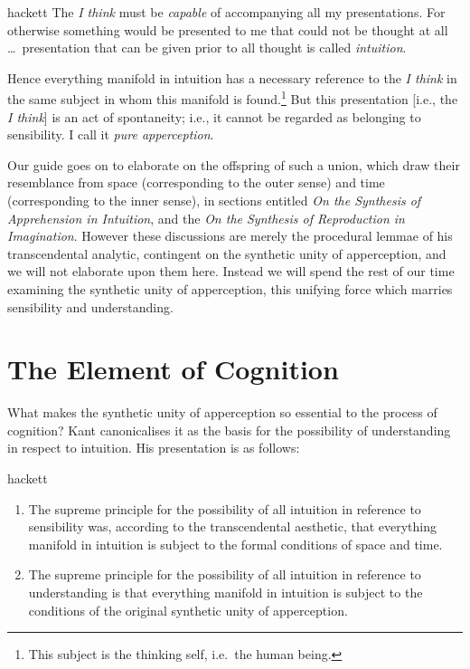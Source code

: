 \begin{displaycquote}[B132]{hackett}
  The \emph{I think} must be \emph{capable} of accompanying all my presentations. For otherwise something would be presented to me that could not be thought at all \ldots\ presentation that can be given prior to all thought is called \emph{intuition}.

  Hence everything manifold in intuition has a necessary reference to the \emph{I think} in the same subject in whom this manifold is found.\footnote{This subject is the thinking self, i.e.\ the human being.} But this presentation [i.e., the \emph{I think}] is an act of spontaneity; i.e., it cannot be regarded as belonging to sensibility. I call it \emph{pure apperception}.
\end{displaycquote}

\noindent
Our guide goes on to elaborate on the offspring of such a union, which draw their resemblance from space (corresponding to the outer sense) and time (corresponding to the inner sense), in sections entitled \emph{On the Synthesis of Apprehension in Intuition}, and the \emph{On the Synthesis of Reproduction in Imagination}. However these discussions are merely the procedural lemmae of his transcendental analytic, contingent on the synthetic unity of apperception, and we will not elaborate upon them here. Instead we will spend the rest of our time examining the synthetic unity of apperception, this unifying force which marries sensibility and understanding.

\clearpage

\section{The Element of Cognition}

What makes the synthetic unity of apperception so essential to the process of cognition? Kant canonicalises it as the basis for the possibility of understanding in respect to intuition. His presentation is as follows:
\begin{displaycquote}[B137]{hackett}%
  \begin{enumerate}[partopsep=0pt,topsep=0pt,parsep=0pt,align=left,labelsep=0pt,leftmargin=0pt]%
    \item The supreme principle for the possibility of all intuition in reference to sensibility was, according to the transcendental aesthetic, that everything manifold in intuition is subject to the formal conditions of space and time.
    \item The supreme principle for the possibility of all intuition in reference to understanding is that everything manifold in intuition is subject to the conditions of the original synthetic unity of apperception.
  \end{enumerate}
\end{displaycquote}

